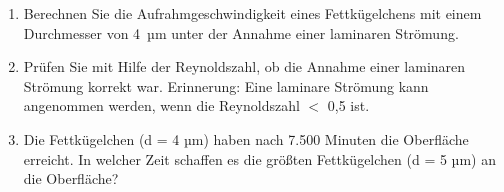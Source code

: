 \documentclass[a4paper,11pt]{article}
\newif\ifshowme
\begin{document}
\begin{enumerate}[label=\alph*)]

\item Berechnen Sie die Aufrahmgeschwindigkeit eines Fettkügelchens mit einem
Durchmesser von \mbox{4 µm} unter der Annahme einer laminaren Strömung.

\ifshowme
\antwort{
\begin{align*}
v &= \frac{d^2 \cdot g \cdot (\rho_1 - \rho_2)}{18 \cdot \eta} \\
v &= \frac{(4 \cdot 10^{-6} ~\text{m})^2 \cdot 9,81 ~\text{m/s}^2 \cdot 99,8 ~\text{kg/m}^3}{18 \cdot 1,79 \cdot 10^{-3} ~\text{Pa s}} \\
v &= 4,86 \cdot 10^{-7} ~\text{m/s}
\end{align*}
}
\else
\fi




\item Prüfen Sie mit Hilfe der Reynoldszahl, ob die Annahme einer laminaren Strömung
korrekt war. Erinnerung: Eine laminare Strömung kann angenommen werden, wenn
die Reynoldszahl $<$ 0,5 ist.
\ifshowme
\antwort{
\begin{align*}
Re &= \frac{\rho \cdot d \cdot v}{\eta} \\
Re &= \frac{1028 ~\text{kg/m}^3 \cdot 4 \cdot 10^{-6} ~\text{m} \cdot 4,86 \cdot 10^{-7} ~\text{m/s}}{1,79 \cdot 10^{-3} ~\text{Pa s}} \\
Re &= 1,116 \cdot 10^{-6}
\end{align*}
\RA Die Annahme einer laminaren Strömung war korrekt

}
\else
\fi


\item Die Fettkügelchen (d = 4 µm) haben nach 7.500 Minuten die Oberfläche erreicht. In
welcher Zeit schaffen es die größten Fettkügelchen (d = 5 µm) an die Oberfläche?

\ifshowme
\antwort{

Strecke berechnen:
\begin{align*}
s = v \cdot t \rightarrow s &= 4,86 \cdot 10^{-7} ~\text{m/s} \cdot 7500 \cdot 60s \\
 &= 0,2187 ~\text{m} \\
\end{align*}
Geschwindigkeit größerer Fettkügelchen berechnen: 
\begin{align*}
v &= \frac{d^2 \cdot g \cdot (\rho_1 - \rho_2)}{18 \cdot \eta} \\
v &= \frac{(5 \cdot 10^{-6} ~\text{m})^2 \cdot 9,81 ~\text{m/s}^2 \cdot 99,8 ~\text{kg/m}^3}{18 \cdot 1,79 \cdot 10^{-3} ~\text{Pa s}} \\
v &= 7,59 \cdot 10^{-7} ~\text{m/s}
\end{align*}
Zeit die größere Fettkügelchen für Strecke $s$ benötigen:
\begin{align*}
t = \frac{s}{v} \rightarrow t &= \frac{0,2187 ~\text{m}}{7,59 \cdot 10^{-7} ~\text{m/s} \cdot 60} \\
&= 4802,4 ~\text{min}
\end{align*}
}
\else
\fi


\end{enumerate}
\end{document}
